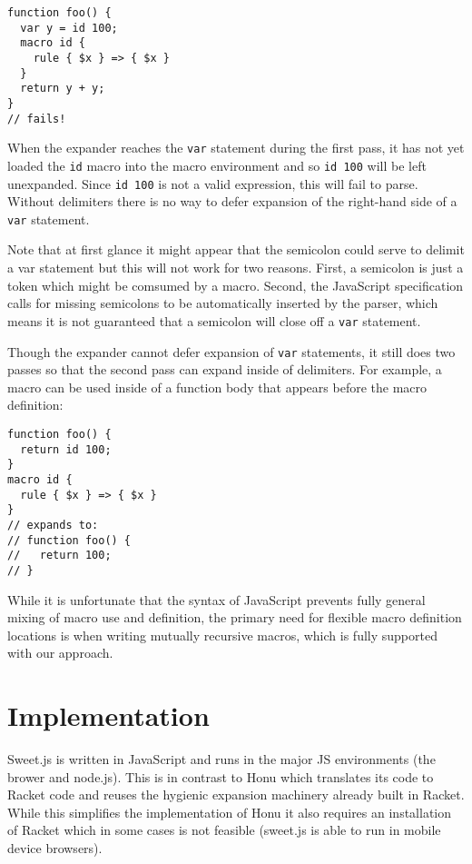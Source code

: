 \documentclass[preprint,10pt]{sigplanconf}
\begin{document}
\begin{lstlisting}
function foo() {
  var y = id 100;
  macro id {
    rule { $x } => { $x }
  }
  return y + y;
}
// fails!
\end{lstlisting}
When the expander reaches the \verb!var! statement during the
first pass, it has not yet loaded the \verb!id! macro into the
macro environment and so \verb!id 100! will be left unexpanded.
Since \verb!id 100! is not a valid expression, this will fail to
parse.
Without delimiters there is no way to defer expansion of the
right-hand side of a \verb!var! statement.

Note that at first glance it might appear that the semicolon could
serve to delimit a var statement but this will not work for two
reasons. First, a semicolon is just a token which might be comsumed by
a macro. Second, the JavaScript specification calls for missing
semicolons to be automatically inserted by the parser, which means
it is not guaranteed that a semicolon will close off a \verb!var!
statement.

Though the expander cannot defer expansion of \verb!var!
statements, it still does two passes so that
the second pass can expand inside of delimiters. For example, a macro
can be used inside of a function body that appears before the macro definition:
\begin{lstlisting}
function foo() {
  return id 100;
}
macro id {
  rule { $x } => { $x }
}
// expands to:
// function foo() {
//   return 100;
// }
\end{lstlisting}


While it is unfortunate that the syntax of JavaScript prevents fully
general mixing of macro use and definition, the primary need for
flexible macro definition locations is when writing mutually recursive
macros, which is fully supported with our approach.

\section{Implementation}
\label{sec:implementation}

Sweet.js is written in JavaScript and runs in the major JS
environments (\ie the brower and node.js). This is in contrast to Honu
which translates its code to Racket code and reuses the hygienic
expansion machinery already built in Racket. While this simplifies
the implementation of Honu it also requires an installation of Racket
which in some cases is not feasible (\eg sweet.js is able to run in
mobile device browsers).
\end{document}

